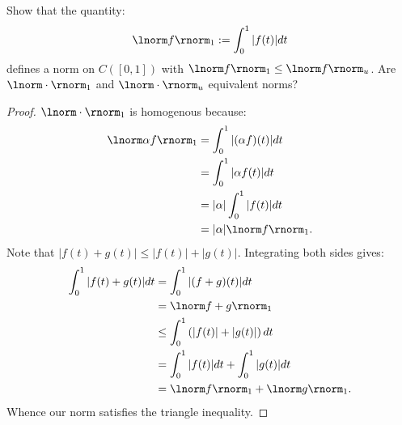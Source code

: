 \documentclass[11pt,twoside,openany]{memoir}
\begin{document}
    \begin{exercise}
        Show that the quantity:
            \begin{equation*}
            \begin{split}
                \lnorm f \rnorm_1 := \int_0^1 |f(t)|dt
            \end{split}
            \end{equation*}
        defines a norm on $C([0,1])$ with $\lnorm f \rnorm_1 \leq \lnorm f \rnorm_u$. Are $\lnorm \cdot \rnorm_1$ and $\lnorm \cdot \rnorm_u$ equivalent norms?
    \end{exercise}
        {\color{red} \begin{proof}
            $\lnorm \cdot \rnorm_1$ is homogenous because:
                \begin{equation*}
                \begin{split}
                    \lnorm \alpha f \rnorm_1
                    & = \int_0^1 |(\alpha f)(t)| dt \\
                    & = \int_0^1 |\alpha f(t)|dt \\
                    & = |\alpha|\int_0^1 |f(t)|dt \\
                    & = |\alpha| \lnorm f \rnorm_1.
                \end{split}
                \end{equation*}
            Note that $|f(t) + g(t)| \leq |f(t)| + |g(t)|$. Integrating both sides gives:
                \begin{equation*}
                \begin{split}
                    \int_0^1 |f(t) + g(t)|dt
                    & = \int_0^1 |(f+g)(t)|dt \\
                    & = \lnorm f+g \rnorm_1 \\
                    & \leq \int_0^1 \left( |f(t)| + |g(t)| \right)dt \\
                    & = \int_0^1 |f(t)|dt + \int_0^1 |g(t)|dt \\
                    & = \lnorm f \rnorm_1 +\lnorm g \rnorm_1.
                \end{split}
                \end{equation*}
            Whence our norm satisfies the triangle inequality.
        \end{proof}}
\end{document}
